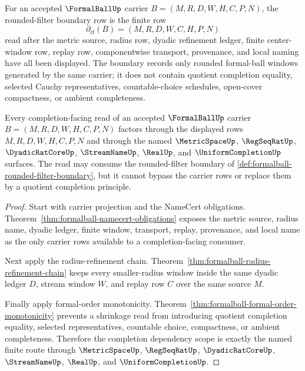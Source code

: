 \begin{definition}
\label{def:formalball-rounded-filter-boundary}
For an accepted $\FormalBallUp$ carrier $B=(M,R,D,W,H,C,P,N)$, the rounded-filter boundary row is the finite row
$$
\partial_{\mathrm{rf}}(B)=(M,R,D,W,C,H,P,N)
$$
read after the metric source, radius row, dyadic refinement ledger, finite center-window row, replay row, componentwise transport, provenance, and local naming have all been displayed. The boundary records only rounded formal-ball windows generated by the same carrier; it does not contain quotient completion equality, selected Cauchy representatives, countable-choice schedules, open-cover compactness, or ambient completeness.
\end{definition}

\begin{theorem}
\label{thm:formalball-completion-dependency-scope}
Every completion-facing read of an accepted $\FormalBallUp$ carrier $B=(M,R,D,W,H,C,P,N)$ factors through the displayed rows $M,R,D,W,H,C,P,N$ and through the named $\MetricSpaceUp$, $\RegSeqRatUp$, $\DyadicRatCoreUp$, $\StreamNameUp$, $\RealUp$, and $\UniformCompletionUp$ surfaces. The read may consume the rounded-filter boundary of \autoref{def:formalball-rounded-filter-boundary}, but it cannot bypass the carrier rows or replace them by a quotient completion principle.
\end{theorem}
\begin{proof}
Start with carrier projection and the NameCert obligations. Theorem~\ref{thm:formalball-namecert-obligations} exposes the metric source, radius name, dyadic ledger, finite window, transport, replay, provenance, and local name as the only carrier rows available to a completion-facing consumer.

Next apply the radius-refinement chain. Theorem~\ref{thm:formalball-radius-refinement-chain} keeps every smaller-radius window inside the same dyadic ledger $D$, stream window $W$, and replay row $C$ over the same source $M$.

Finally apply formal-order monotonicity. Theorem~\ref{thm:formalball-formal-order-monotonicity} prevents a shrinkage read from introducing quotient completion equality, selected representatives, countable choice, compactness, or ambient completeness. Therefore the completion dependency scope is exactly the named finite route through $\MetricSpaceUp$, $\RegSeqRatUp$, $\DyadicRatCoreUp$, $\StreamNameUp$, $\RealUp$, and $\UniformCompletionUp$.
\end{proof}

